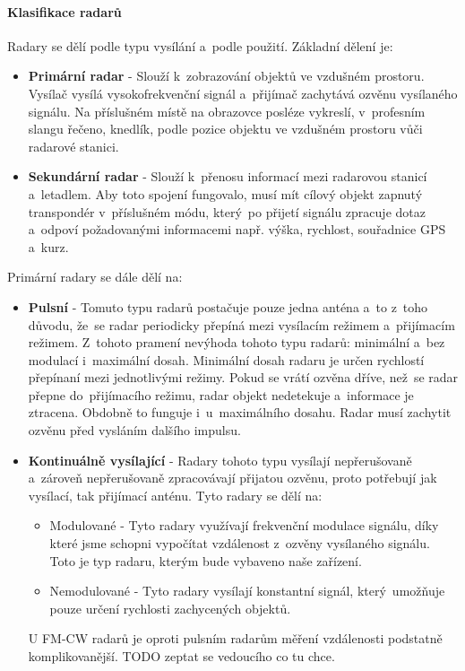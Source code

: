	\paragraph{Klasifikace radarů}
			Radary se dělí podle typu vysílání a~podle použití\cite{radarClasification}. Základní dělení je: 
			\begin{itemize}
				\item \textbf{Primární radar}	-	Slouží k~zobrazování objektů ve vzdušném prostoru. Vysílač vysílá vysokofrekvenční signál a~přijímač zachytává ozvěnu vysílaného signálu. Na příslušném místě na obrazovce posléze vykreslí, v~profesním slangu řečeno, knedlík, podle pozice objektu ve vzdušném prostoru vůči radarové stanici.
					
				\item \textbf{Sekundární radar}	-	Slouží k~přenosu informací mezi radarovou stanicí a~letadlem. Aby toto spojení fungovalo, musí mít cílový objekt zapnutý transpondér v~příslušném módu, který~po přijetí signálu zpracuje dotaz a~odpoví požadovanými informacemi např. výška, rychlost, souřadnice GPS a~kurz. 
			\end{itemize}
			
			Primární radary se dále dělí na:
			\begin{itemize}
				\item \textbf{Pulsní}	-	Tomuto typu radarů postačuje pouze jedna anténa a~to z~toho důvodu, že~se radar periodicky přepíná mezi vysílacím režimem a~přijímacím režimem. Z~tohoto pramení nevýhoda tohoto typu radarů: minimální a~bez modulací i~maximální dosah. Minimální dosah radaru je určen rychlostí přepínaní mezi jednotlivými režimy. Pokud se vrátí ozvěna dříve, než~se radar přepne do~přijímacího režimu, radar objekt nedetekuje a~informace je ztracena. Obdobně to funguje i~u~maximálního dosahu. Radar musí zachytit ozvěnu před vysláním dalšího impulsu.
				
				\item \textbf{Kontinuálně vysílající}	-	Radary tohoto typu vysílají nepřerušovaně a~zároveň nepřerušovaně zpracovávají přijatou ozvěnu, proto potřebují jak vysílací, tak přijímací anténu. Tyto radary se dělí na:
					
					\begin{itemize}
						\item Modulované - Tyto radary využívají frekvenční modulace signálu, díky které jsme schopni vypočítat vzdálenost z~ozvěny vysílaného signálu. Toto je typ radaru, kterým bude vybaveno naše zařízení.
						
						\item Nemodulované - Tyto radary vysílají konstantní signál, který~umožňuje pouze určení rychlosti zachycených objektů.
					\end{itemize}
					
					U FM-CW\footnotemark{} radarů je oproti pulsním radarům měření vzdálenosti podstatně komplikovanější. TODO zeptat se vedoucího co tu chce.
			\end{itemize}
		
